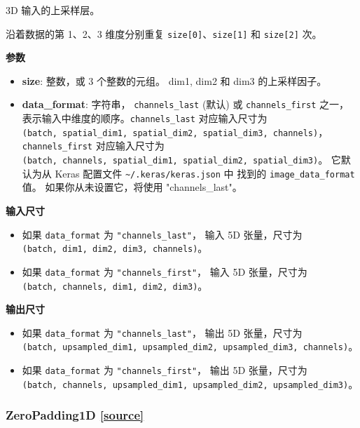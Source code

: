 3D 输入的上采样层。

沿着数据的第 1、2、3 维度分别重复
\texttt{size{[}0{]}}、\texttt{size{[}1{]}} 和 \texttt{size{[}2{]}} 次。

\textbf{参数}

\begin{itemize}
\tightlist
\item
  \textbf{size}: 整数，或 3 个整数的元组。 dim1, dim2 和 dim3
  的上采样因子。
\item
  \textbf{data\_format}: 字符串， \texttt{channels\_last} (默认) 或
  \texttt{channels\_first} 之一，
  表示输入中维度的顺序。\texttt{channels\_last} 对应输入尺寸为
  \texttt{(batch,\ spatial\_dim1,\ spatial\_dim2,\ spatial\_dim3,\ channels)}，
  \texttt{channels\_first} 对应输入尺寸为
  \texttt{(batch,\ channels,\ spatial\_dim1,\ spatial\_dim2,\ spatial\_dim3)}。
  它默认为从 Keras 配置文件 \texttt{\textasciitilde{}/.keras/keras.json}
  中 找到的 \texttt{image\_data\_format} 值。 如果你从未设置它，将使用
  "channels\_last"。
\end{itemize}

\textbf{输入尺寸}

\begin{itemize}
\tightlist
\item
  如果 \texttt{data\_format} 为 \texttt{"channels\_last"}， 输入 5D
  张量，尺寸为 \texttt{(batch,\ dim1,\ dim2,\ dim3,\ channels)}。
\item
  如果 \texttt{data\_format} 为 \texttt{"channels\_first"}， 输入 5D
  张量，尺寸为 \texttt{(batch,\ channels,\ dim1,\ dim2,\ dim3)}。
\end{itemize}

\textbf{输出尺寸}

\begin{itemize}
\tightlist
\item
  如果 \texttt{data\_format} 为 \texttt{"channels\_last"}， 输出 5D
  张量，尺寸为
  \texttt{(batch,\ upsampled\_dim1,\ upsampled\_dim2,\ upsampled\_dim3,\ channels)}。
\item
  如果 \texttt{data\_format} 为 \texttt{"channels\_first"}， 输出 5D
  张量，尺寸为
  \texttt{(batch,\ channels,\ upsampled\_dim1,\ upsampled\_dim2,\ upsampled\_dim3)}。
\end{itemize}




\subsubsection{ZeroPadding1D {\href{https://github.com/keras-team/keras/blob/master/keras/layers/convolutional.py\#L1692}{{[}source{]}}}}


